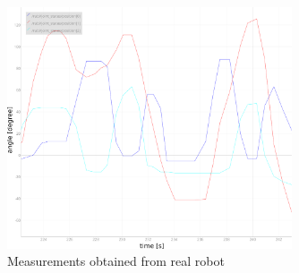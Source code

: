 \begin{figure}[tb]
  \centering
  \includegraphics[width=0.75\textwidth]{figures/position_measurements.pdf}
  \caption{Measurements obtained from real robot}
  \label{fig:position_measurements}
\end{figure}

